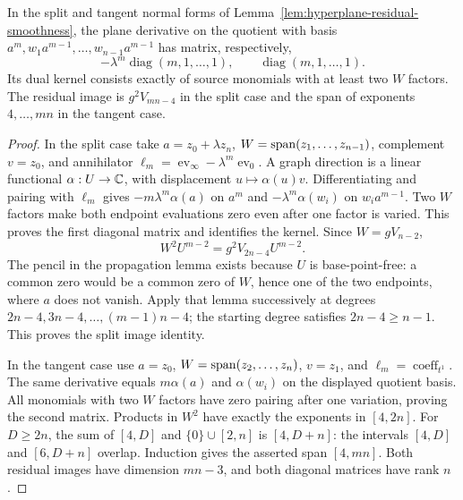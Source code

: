 \begin{proposition}
\label{prop:hyperplane-explicit-polar}
In the split and tangent normal forms of
Lemma~\ref{lem:hyperplane-residual-smoothness}, the plane derivative
on the quotient with basis $a^m,w_1a^{m-1},\ldots,w_{n-1}a^{m-1}$
has matrix, respectively,
\begin{equation}\label{eq:hyperplane-polar-diagonals}
 -\lambda^m\operatorname{diag}(m,1,\ldots,1),
 \qquad \operatorname{diag}(m,1,\ldots,1).
\end{equation}
Its dual kernel consists exactly of source monomials with at least
two $W$ factors. The residual image is $g^2V_{mn-4}$ in the split
case and the span of exponents $4,\ldots,mn$ in the tangent case.
\end{proposition}
\begin{proof}
In the split case take $a=z_0+\lambda z_n$, $W=\operatorname{span}(z_1,\ldots,z_{n-1})$,
complement $v=z_0$, and annihilator
$\ell_m=\operatorname{ev}_{\infty}-\lambda^m\operatorname{ev}_0$.
A graph direction is a linear functional $\alpha:U\to\mathbb C$,
with displacement $u\mapsto\alpha(u)v$. Differentiating and pairing
with $\ell_m$ gives $-m\lambda^m\alpha(a)$ on $a^m$ and
$-\lambda^m\alpha(w_i)$ on $w_ia^{m-1}$. Two $W$ factors make
both endpoint evaluations zero even after one factor is varied.
This proves the first diagonal matrix and identifies the kernel.
Since $W=gV_{n-2}$,
\[
 W^2U^{m-2}=g^2V_{2n-4}U^{m-2}.
\]
The pencil in the propagation lemma exists because $U$ is
base-point-free: a common zero would be a common zero of $W$, hence
one of the two endpoints, where $a$ does not vanish. Apply that lemma
successively at degrees $2n-4,3n-4,\ldots,(m-1)n-4$; the starting
degree satisfies $2n-4\ge n-1$. This proves the split image identity.

In the tangent case use $a=z_0$, $W=\operatorname{span}(z_2,\ldots,z_n)$,
$v=z_1$, and $\ell_m=\operatorname{coeff}_{t^1}$.
The same derivative equals $m\alpha(a)$ and $\alpha(w_i)$ on
the displayed quotient basis. All monomials with two $W$ factors
have zero pairing after one variation, proving the second matrix.
Products in $W^2$ have exactly the exponents in $[4,2n]$.
For $D\ge2n$, the sum of $[4,D]$ and $\{0\}\cup[2,n]$
is $[4,D+n]$: the intervals $[4,D]$ and $[6,D+n]$ overlap.
Induction gives the asserted span $[4,mn]$. Both residual images
have dimension $mn-3$, and both diagonal matrices have rank $n$.
\end{proof}

